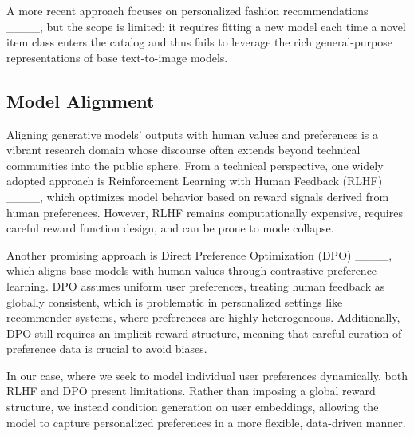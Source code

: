 A more recent approach focuses on personalized fashion recommendations ____, but the scope is limited: it requires fitting a new model each time a novel item class enters the catalog and thus fails to leverage the rich general-purpose representations of base text-to-image models.



\subsection{Model Alignment}

Aligning generative models' outputs with human values and preferences is a vibrant research domain whose discourse often extends beyond technical communities into the public sphere. From a technical perspective, one widely adopted approach is Reinforcement Learning with Human Feedback (RLHF) ____, which optimizes model behavior based on reward signals derived from human preferences. However, RLHF remains computationally expensive, requires careful reward function design, and can be prone to mode collapse.

Another promising approach is Direct Preference Optimization (DPO) ____, which aligns base models with human values through contrastive preference learning. DPO assumes uniform user preferences, treating human feedback as globally consistent, which is problematic in personalized settings like recommender systems, where preferences are highly heterogeneous. Additionally, DPO still requires an implicit reward structure, meaning that careful curation of preference data is crucial to avoid biases.

In our case, where we seek to model individual user preferences dynamically, both RLHF and DPO present limitations. Rather than imposing a global reward structure, we instead condition generation on user embeddings, allowing the model to capture personalized preferences in a more flexible, data-driven manner.

